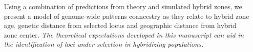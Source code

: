 \documentclass[11pt,letterpaper]{article}
\newcommand{\yb}[1]{{\em \color{magenta} #1}}
\begin{document}
Using a combination of predictions from theory and simulated hybrid zones, we present a model of genome-wide patterns coancestry as they relate to hybrid zone age, genetic distance from selected locus and geographic distance from hybrid zone center.  
\yb{The theoretical expectations developed in this manuscript can aid in the identification of loci under selection in hybridizing populations.} 





\end{document}
